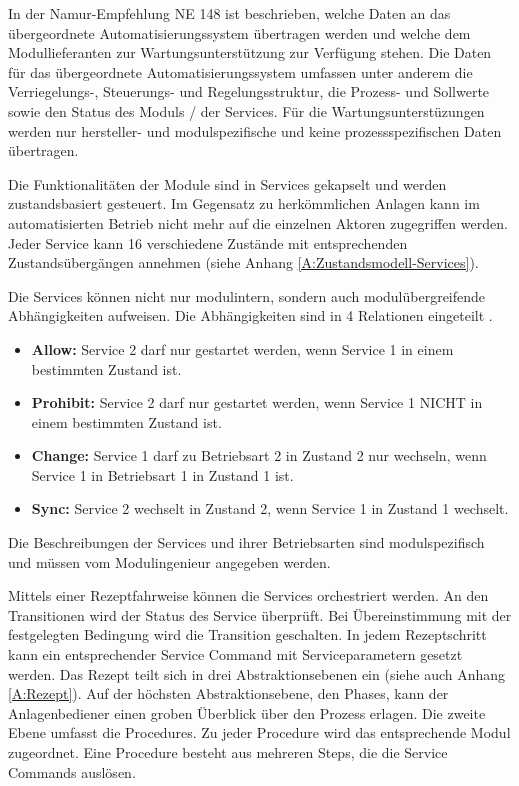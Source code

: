 In der Namur-Empfehlung NE 148 \cite{NAMURArbeitskreis1.122013} ist beschrieben, welche Daten an das übergeordnete Automatisierungssystem übertragen werden und welche dem Modullieferanten zur Wartungsunterstützung zur Verfügung stehen. Die Daten für das übergeordnete Automatisierungssystem umfassen unter anderem die Verriegelungs-, Steuerungs- und Regelungsstruktur, die Prozess- und Sollwerte sowie den Status des Moduls / der Services. Für die Wartungsunterstüzungen werden nur hersteller- und modulspezifische und keine prozessspezifischen Daten übertragen.

Die Funktionalitäten der Module sind in Services gekapselt und werden zustandsbasiert gesteuert. Im Gegensatz zu herkömmlichen Anlagen kann im automatisierten Betrieb nicht mehr auf die einzelnen Aktoren zugegriffen werden. Jeder Service kann 16 verschiedene Zustände mit entsprechenden Zustandsübergängen annehmen (siehe Anhang \ref{A:Zustandsmodell-Services}).

Die Services können nicht nur modulintern, sondern auch modulübergreifende Abhängigkeiten aufweisen. Die Abhängigkeiten sind in 4 Relationen eingeteilt \cite{Ladiges2018}.
\begin{itemize}
\item \textbf{Allow:} Service 2 darf nur gestartet werden, wenn Service 1 in einem bestimmten Zustand ist.
\item \textbf{Prohibit:} Service 2 darf nur gestartet werden, wenn Service 1 NICHT in einem bestimmten Zustand ist.
\item \textbf{Change:} Service 1 darf zu Betriebsart 2 in Zustand 2 nur wechseln, wenn Service 1 in Betriebsart 1 in Zustand 1 ist.
\item \textbf{Sync:} Service 2 wechselt in Zustand 2, wenn Service 1 in Zustand 1 wechselt.
\end{itemize} 
Die Beschreibungen der Services und ihrer Betriebsarten sind modulspezifisch und müssen vom Modulingenieur angegeben werden.

Mittels einer Rezeptfahrweise können die Services orchestriert werden. An den Transitionen wird der Status des Service überprüft. Bei Übereinstimmung mit der festgelegten Bedingung wird die Transition geschalten. In jedem Rezeptschritt kann ein entsprechender Service Command mit Serviceparametern gesetzt werden. Das Rezept teilt sich in drei Abstraktionsebenen ein (siehe auch Anhang \ref{A:Rezept}). Auf der höchsten Abstraktionsebene, den Phases, kann der Anlagenbediener einen groben Überblick über den Prozess erlagen. Die zweite Ebene umfasst die Procedures. Zu jeder Procedure wird das entsprechende Modul zugeordnet. Eine Procedure besteht aus mehreren Steps, die die Service Commands auslösen. \cite{Bloch2017}

